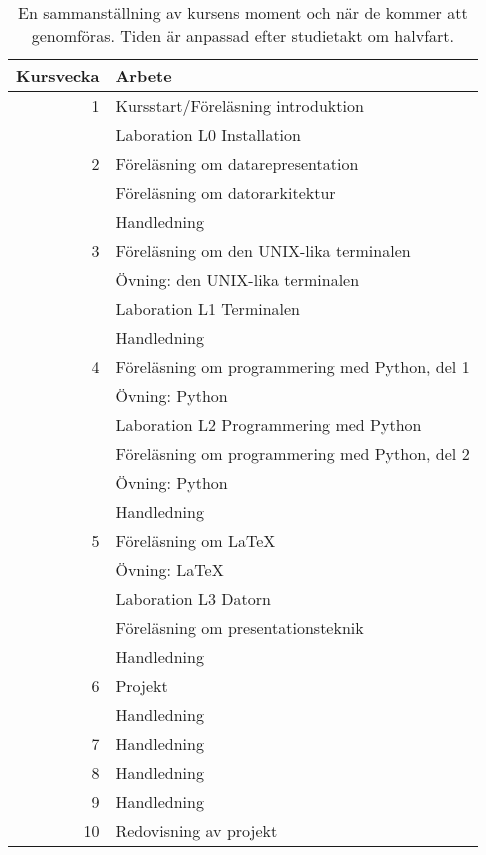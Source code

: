 \documentclass[a4paper,logo]{miunart}
\begin{document}
\begin{table}
	\centering
  \begin{tabular}{rp{9cm}}
    \toprule
		\textbf{Kursvecka}	& \textbf{Arbete} \\
    \midrule
    1	& Kursstart/Föreläsning introduktion \\
      & Laboration L0 Installation \\
    \midrule
    2 & Föreläsning om datarepresentation \\
      & Föreläsning om datorarkitektur \\
      & Handledning \\
    \midrule
    3 & Föreläsning om den UNIX-lika terminalen \\
      & Övning: den UNIX-lika terminalen \\
      & Laboration L1 Terminalen \\
      & Handledning \\
    \midrule
    4 & Föreläsning om programmering med Python, del 1 \\
      & Övning: Python \\
      & Laboration L2 Programmering med Python \\
      & Föreläsning om programmering med Python, del 2 \\
      & Övning: Python \\
      & Handledning \\
    \midrule
    5 & Föreläsning om LaTeX \\
      & Övning: LaTeX \\
      & Laboration L3 Datorn \\
      & Föreläsning om presentationsteknik \\
      & Handledning \\
    \midrule
    6 & Projekt \\
      & Handledning \\
    \midrule
    7 & Handledning \\
    \midrule
    8 & Handledning \\
    \midrule
    9 & Handledning \\
    \midrule
    10  & Redovisning av projekt \\
    \bottomrule
  \end{tabular}
  \caption{En sammanställning av kursens moment och när de kommer att 
  genomföras.
  Tiden är anpassad efter studietakt om halvfart.}
	\label{tbl:schema}
\end{table}
\end{document}
